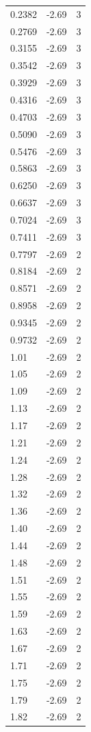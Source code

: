 \begin{longtable}{lrr}
  0.2382 & -2.69 & 3 \\
  0.2769 & -2.69 & 3 \\
  0.3155 & -2.69 & 3 \\
  0.3542 & -2.69 & 3 \\
  0.3929 & -2.69 & 3 \\
  0.4316 & -2.69 & 3 \\
  0.4703 & -2.69 & 3 \\
  0.5090 & -2.69 & 3 \\
  0.5476 & -2.69 & 3 \\
  0.5863 & -2.69 & 3 \\
  0.6250 & -2.69 & 3 \\
  0.6637 & -2.69 & 3 \\
  0.7024 & -2.69 & 3 \\
  0.7411 & -2.69 & 3 \\
  0.7797 & -2.69 & 2 \\
  0.8184 & -2.69 & 2 \\
  0.8571 & -2.69 & 2 \\
  0.8958 & -2.69 & 2 \\
  0.9345 & -2.69 & 2 \\
  0.9732 & -2.69 & 2 \\
  1.01 & -2.69 & 2 \\
  1.05 & -2.69 & 2 \\
  1.09 & -2.69 & 2 \\
  1.13 & -2.69 & 2 \\
  1.17 & -2.69 & 2 \\
  1.21 & -2.69 & 2 \\
  1.24 & -2.69 & 2 \\
  1.28 & -2.69 & 2 \\
  1.32 & -2.69 & 2 \\
  1.36 & -2.69 & 2 \\
  1.40 & -2.69 & 2 \\
  1.44 & -2.69 & 2 \\
  1.48 & -2.69 & 2 \\
  1.51 & -2.69 & 2 \\
  1.55 & -2.69 & 2 \\
  1.59 & -2.69 & 2 \\
  1.63 & -2.69 & 2 \\
  1.67 & -2.69 & 2 \\
  1.71 & -2.69 & 2 \\
  1.75 & -2.69 & 2 \\
  1.79 & -2.69 & 2 \\
  1.82 & -2.69 & 2 \\

\end{longtable}

